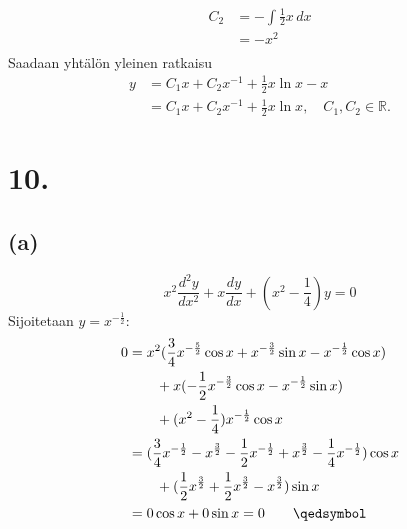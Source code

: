 \documentclass{article}
\begin{document}
\begin{align*}
  C_2 &= -\int \frac{1}{2}x\,dx \\
      &= -x^2 \\
\end{align*}
Saadaan yhtälön yleinen ratkaisu
\begin{align*}
  y &= C_1x + C_2x^{-1} + \frac{1}{2}x\ln x - x \\
    &= C_1x + C_2x^{-1} + \frac{1}{2}x\ln x, \quad C_1, C_2 \in \mathbb{R}.
\end{align*}

\section*{10.}

\subsection*{(a)}

\[
  x^2\frac{d^2 y}{d x^2} + x\frac{dy}{dx} + (x^2 - \frac{1}{4})y = 0
\]
Sijoitetaan $y = x^{-\frac{1}{2}}$:
\begin{align*}
  0 &= x^2(\frac{3}{4}x^{-\frac{5}{2}}\cos x + x^{-\frac{3}{2}}\sin x
   - x^{-\frac{1}{2}}\cos x) \\
    &\qquad+ x(-\frac{1}{2}x^{-\frac{3}{2}}\cos x - x^{-\frac{1}{2}}\sin x) \\
    &\qquad+ (x^2 - \frac{1}{4})x^{-\frac{1}{2}}\cos x \\
    &= (\frac{3}{4}x^{-\frac{1}{2}} - x^{\frac{3}{2}} - \frac{1}{2}x^{-\frac{1}{2}}
    + x^{\frac{3}{2}} - \frac{1}{4}x^{-\frac{1}{2}})\cos x \\
    &\qquad + (\frac{1}{2}x^{\frac{3}{2}} + \frac{1}{2}x^{\frac{3}{2}} - x^{\frac{3}{2}})\sin x \\
    &= 0\cos x + 0\sin x = 0 \qquad \qedsymbol
\end{align*}
\end{document}
